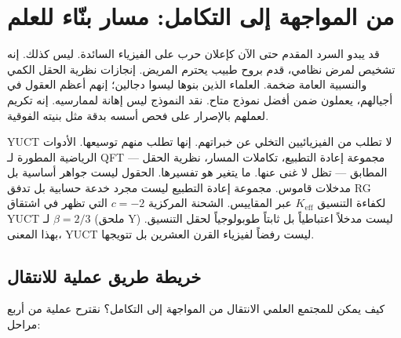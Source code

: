 \documentclass[12pt,a4paper]{article}
\begin{document}
	\section{من المواجهة إلى التكامل: مسار بنّاء للعلم}
	
	قد يبدو السرد المقدم حتى الآن كإعلان حرب على الفيزياء السائدة. ليس كذلك. إنه تشخيص لمرض نظامي، قدم بروح طبيب يحترم المريض. إنجازات نظرية الحقل الكمي والنسبية العامة ضخمة. العلماء الذين بنوها ليسوا دجالين؛ إنهم أعظم العقول في أجيالهم، يعملون ضمن أفضل نموذج متاح. نقد النموذج ليس إهانة لممارسيه. إنه تكريم لعملهم بالإصرار على فحص أسسه بدقة مثل بنيته الفوقية.
	
	YUCT لا تطلب من الفيزيائيين التخلي عن خبراتهم. إنها تطلب منهم توسيعها. الأدوات الرياضية المطورة لـ QFT — مجموعة إعادة التطبيع، تكاملات المسار، نظرية الحقل المطابق — تظل لا غنى عنها. ما يتغير هو تفسيرها. الحقول ليست جواهر أساسية بل مدخلات قاموس. مجموعة إعادة التطبيع ليست مجرد خدعة حسابية بل تدفق RG لكفاءة التنسيق \(K_{\mathrm{eff}}\) عبر المقاييس. الشحنة المركزية \(c = -2\) التي تظهر في اشتقاق YUCT لـ \(\beta = 2/3\) (ملحق Y) ليست مدخلاً اعتباطياً بل ثابتاً طوبولوجياً لحقل التنسيق. بهذا المعنى، YUCT ليست رفضاً لفيزياء القرن العشرين بل تتويجها.
	
	\subsection{خريطة طريق عملية للانتقال}
	
	كيف يمكن للمجتمع العلمي الانتقال من المواجهة إلى التكامل؟ نقترح عملية من أربع مراحل:
	
\end{document}
